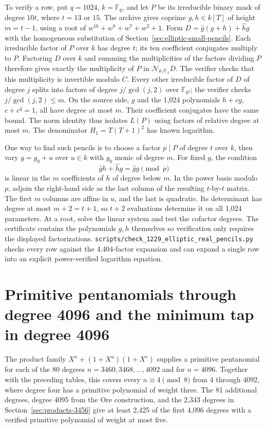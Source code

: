 \documentclass[11pt]{article}
\newcommand{\F}{\mathbb F_2}
\begin{document}
To verify a row, put \(q=1024\), \(k=\mathbb F_q\), and let \(P\)
be its irreducible binary mask of degree \(10t\), where \(t=13\)
or \(15\). The archive gives coprime \(g,h\in k[T]\) of height
\(m=t-1\), using a root of \(w^{10}+w^8+w^7+w^2+1\).
Form \(D=\widehat g(g+h)+\widehat h g\) with the homogeneous
substitution of Section~\ref{sec:elliptic-small-pencils}.
Each irreducible factor of \(P\) over \(k\) has degree \(t\);
its ten coefficient conjugates multiply to \(P\). Factoring \(D\)
over \(k\) and summing the multiplicities of the factors dividing
\(P\) therefore gives exactly the multiplicity of \(P\) in
\(\mathcal N_{k/\F}D\). The verifier checks that this multiplicity
is invertible modulo \(C\). Every other irreducible factor of \(D\)
of degree \(j\) splits into factors of degree \(j/\gcd(j,2)\) over
\(\mathbb F_{q^2}\); the verifier checks \(j/\gcd(j,2)\le m\).
On the source side, \(g\) and the 1,024 polynomials \(h+c g\),
\(c+c^q=1\), all have degree at most \(m\). Their coefficient
conjugates have the same bound. The norm identity thus isolates
\(L(P)\) using factors of relative degree at most \(m\). The
denominator \(H_1=T(T+1)^2\) has known logarithm.

One way to find such pencils is to choose a factor \(p\mid P\) of
degree \(t\) over \(k\), then vary \(g=g_0+u\) over \(u\in k\)
with \(g_0\) monic of degree \(m\). For fixed \(g\), the condition
\[
 \widehat g h+\widehat h g=\widehat g g\pmod p
\]
is linear in the \(m\) coefficients of \(h\) of degree below \(m\).
In the power basis modulo \(p\), adjoin the right-hand side as
the last column of the resulting \(t\)-by-\(t\) matrix.
The first \(m\) columns are affine in \(u\), and the last is
quadratic. Its determinant has degree at most \(m+2=t+1\), so
\(t+2\) evaluations determine it on all 1,024 parameters.
At a root, solve the linear system and test the cofactor degrees.
The certificate contains the polynomials \(g,h\) themselves so
verification only requires the displayed factorizations.
\nolinkurl{scripts/check_1229_elliptic_real_pencils.py} checks
every row against the 4,404-factor expansion and can expand a
single row into an explicit power-verified logarithm equation.

\section{Primitive pentanomials through degree 4096 and the minimum tap in degree 4096}
\label{sec:products-4096}
The product family \(X^n+(1+X^u)(1+X^v)\) supplies a primitive
pentanomial for each of the 80 degrees \(n=3460,3468,\ldots,4092\)
and for \(n=4096\). Together with the preceding tables, this covers
every \(n\equiv4\pmod8\) from 4 through 4092, where degree four
has a primitive polynomial of weight three. The 81 additional degrees,
degree 4095 from the Ore construction, and the 2,343 degrees in
Section~\ref{sec:products-3456} give at least 2,425 of the first
4,096 degrees with a verified primitive polynomial of weight at most five.
\end{document}
